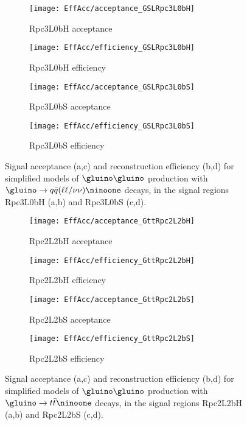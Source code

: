 \begin{figure}[ht]
\centering
\begin{subfigure}[t]{0.49\textwidth}\texttt{[image: EffAcc/acceptance\_GSLRpc3L0bH]}\caption{Rpc3L0bH acceptance}\end{subfigure}
\begin{subfigure}[t]{0.49\textwidth}\texttt{[image: EffAcc/efficiency\_GSLRpc3L0bH]}\caption{Rpc3L0bH efficiency}\end{subfigure}
\begin{subfigure}[t]{0.49\textwidth}\texttt{[image: EffAcc/acceptance\_GSLRpc3L0bS]}\caption{Rpc3L0bS acceptance}\end{subfigure}
\begin{subfigure}[t]{0.49\textwidth}\texttt{[image: EffAcc/efficiency\_GSLRpc3L0bS]}\caption{Rpc3L0bS efficiency}\end{subfigure}
\caption{Signal acceptance (a,c) and reconstruction efficiency (b,d) 
for simplified models of $\gluino\gluino$ production with $\gluino\to q\bar q(\ell\ell/\nu\nu)\ninoone$ decays, 
in the signal regions Rpc3L0bH (a,b) and Rpc3L0bS (c,d).}
\end{figure}

\begin{figure}[ht]
\centering
\begin{subfigure}[t]{0.49\textwidth}\texttt{[image: EffAcc/acceptance\_GttRpc2L2bH]}\caption{Rpc2L2bH acceptance}\end{subfigure}
\begin{subfigure}[t]{0.49\textwidth}\texttt{[image: EffAcc/efficiency\_GttRpc2L2bH]}\caption{Rpc2L2bH efficiency}\end{subfigure}
\begin{subfigure}[t]{0.49\textwidth}\texttt{[image: EffAcc/acceptance\_GttRpc2L2bS]}\caption{Rpc2L2bS acceptance}\end{subfigure}
\begin{subfigure}[t]{0.49\textwidth}\texttt{[image: EffAcc/efficiency\_GttRpc2L2bS]}\caption{Rpc2L2bS efficiency}\end{subfigure}
\caption{Signal acceptance (a,c) and reconstruction efficiency (b,d) 
for simplified models of $\gluino\gluino$ production with $\gluino\to t\bar t\ninoone$ decays, 
in the signal regions Rpc2L2bH (a,b) and Rpc2L2bS (c,d).}
\end{figure}

